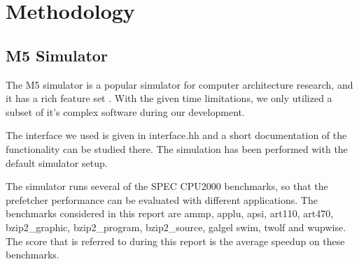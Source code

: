 \section{Methodology}

\subsection{M5 Simulator}

The M5 simulator is a popular simulator for computer architecture research, and
it has a rich feature set \cite{user_doc}. With the given time limitations, we only utilized a
subset of it’s complex software during our development.


The interface we used is
given in interface.hh and a short documentation of the functionality can be
studied there. The simulation has been performed with the default simulator
setup.



The simulator runs several of the SPEC CPU2000 benchmarks, so that the prefetcher
performance can be evaluated with different applications.
The benchmarks considered in this report are ammp, applu, apsi, art110, art470,
bzip2\_graphic, bzip2\_program, bzip2\_source, galgel swim, twolf and wupwise.
The score that is referred to during this report is the average speedup on these benchmarks.


